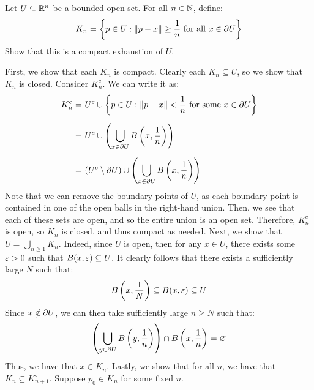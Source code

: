 \newpage
\label{q19}
\begin{qu}[num=19.1]
    Let $ U \subseteq \mathbb{R}^{n} $ be a bounded open set. For all $ n \in
    \mathbb{N} $, define:
    \begin{equation*}
        K_{n} = \left\{{p \in U : \left\|p - x\right\| \geq \frac{1}{n} \textrm{ for all } x
        \in \partial U}\right\}
    \end{equation*}
    Show that this is a compact exhaustion of $ U $.
\end{qu}

\begin{soln}
    First, we show that each $ K_{n} $ is compact.
    Clearly each $ K_{n} \subseteq U $, so we show that $ K_{n} $ is closed.
    Consider $ K_{n}^{c} $. We can write it as:
    \begin{align*}
        K_{n}^{c} = \ & U^{c} \cup \set{p \in U: \norm{p - x} <
        \frac{1}{n} \trm{ for some } x \in \partial U} \vsp
        = \ & U^{c} \cup \left( \bigcup_{x \in \partial U}
        B \left( x, \frac{1}{n} \right) \right) \vsp
        = \ & (U^{c} \setminus \partial U) \cup \left( \bigcup_{x \in \partial U}
        B \left( x, \frac{1}{n} \right) \right)
    \end{align*}
    Note that we can remove the boundary points of $ U $, as each boundary point
    is contained in one of the open balls in the right-hand union.
    Then, we see that each of these sets are open, and so the entire union is an
    open set. Therefore, $ K_{n}^{c} $ is open, so $ K_{n} $ is closed, and thus
    compact as needed. \vsp
    Next, we show that $ U = \bigcup_{n \geq 1}K_{n} $.
    Indeed, since $ U $ is open, then for any $ x \in U $, there exists some
    $ \operatorname{\varepsilon} > 0 $ such that $ B(x, \operatorname{\varepsilon}) \subseteq U $. It clearly follows that
    there exists a sufficiently large $ N $ such that:
    \begin{equation*}
        B \left( x, \frac{1}{N} \right) \subseteq B(x, \operatorname{\varepsilon}) \subseteq U
    \end{equation*}
    Since $ x \notin \partial U $, we can then take sufficiently large $ n \geq N $
    such that:
    \begin{equation*}
        \left( \bigcup_{y \in \partial U}B \left( y, \frac{1}{n} \right) \right) \cap B
        \left( x, \frac{1}{n} \right) = \varnothing
    \end{equation*}
    Thus, we have that $ x \in K_{n} $. \vsp
    Lastly, we show that for all $ n $, we have that $ K_{n} \subseteq
    K_{n+1}^{\circ} $. Suppose $ p_{0} \in K_{n} $ for some fixed $ n $. \vsp

\end{soln}
